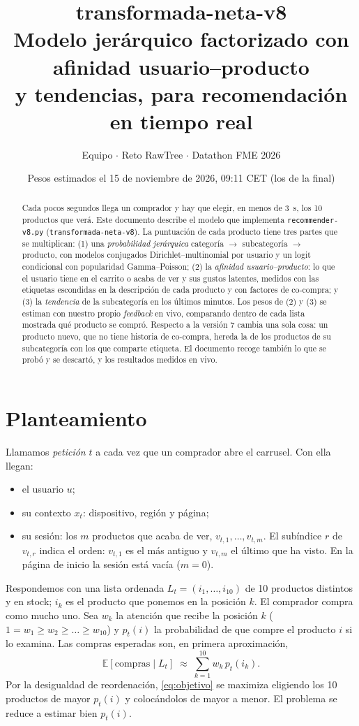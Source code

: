 \documentclass[11pt,a4paper]{article}
\title{\textbf{transformada-neta-v8}\\[0.3em]
\large Modelo jerárquico factorizado con afinidad usuario--producto\\ y tendencias, para recomendación en tiempo real}
\author{Equipo \cod{team\_03} $\cdot$ Reto RawTree $\cdot$ Datathon FME 2026}
\date{Pesos estimados el 15 de noviembre de 2026, 09:11 CET (los de la final)}
\newcommand{\E}{\mathbb{E}}
\newcommand{\cod}[1]{\texttt{#1}}
\begin{document}
\maketitle

\begin{abstract}
\noindent Cada pocos segundos llega un comprador y hay que elegir, en menos de 3~s, los 10 productos
que verá. Este documento describe el modelo que implementa \cod{recommender-v8.py}
(\cod{transformada-neta-v8}). La puntuación de cada producto tiene tres partes que se multiplican:
(1) una \emph{probabilidad jerárquica} categoría $\to$ subcategoría $\to$ producto, con modelos conjugados
Dirichlet--multinomial por usuario y un logit condicional con popularidad Gamma--Poisson; (2) la
\emph{afinidad usuario--producto}: lo que el usuario tiene en el carrito o acaba de ver y sus gustos
latentes, medidos con las etiquetas escondidas en la descripción de cada producto y con factores de
co-compra; y (3) la \emph{tendencia} de la subcategoría en los últimos minutos. Los pesos de (2) y (3) se
estiman con nuestro propio \emph{feedback} en vivo, comparando dentro de cada lista mostrada qué producto
se compró. Respecto a la versión 7 cambia una sola cosa: un producto nuevo, que no tiene historia de
co-compra, hereda la de los productos de su subcategoría con los que comparte etiqueta. El documento
recoge también lo que se probó y se descartó, y los resultados medidos en vivo.
\end{abstract}

\section{Planteamiento}

Llamamos \emph{petición} $t$ a cada vez que un comprador abre el carrusel. Con ella llegan:
\begin{itemize}\setlength{\itemsep}{0.1em}
\item el usuario $u$;
\item su contexto $x_t$: dispositivo, región y página;
\item su sesión: los $m$ productos que acaba de ver, $v_{t,1},\dots,v_{t,m}$. El subíndice $r$ de
$v_{t,r}$ indica el orden: $v_{t,1}$ es el más antiguo y $v_{t,m}$ el último que ha visto. En la página
de inicio la sesión está vacía ($m=0$).
\end{itemize}
Respondemos con una lista ordenada $L_t=(i_1,\dots,i_{10})$ de 10 productos distintos y en stock; $i_k$
es el producto que ponemos en la posición $k$. El comprador compra como mucho uno. Sea $w_k$ la atención
que recibe la posición $k$ ($1=w_1\ge w_2\ge\dots\ge w_{10}$) y $p_t(i)$ la probabilidad de que compre
el producto $i$ si lo examina. Las compras esperadas son, en primera aproximación,
\begin{equation}
\E[\text{compras}\mid L_t] \;\approx\; \sum_{k=1}^{10} w_k\, p_t(i_k). \label{eq:objetivo}
\end{equation}
Por la desigualdad de reordenación, \eqref{eq:objetivo} se maximiza eligiendo los 10 productos de
mayor $p_t(i)$ y colocándolos de mayor a menor. El problema se reduce a estimar bien $p_t(i)$.
\end{document}
